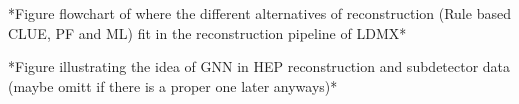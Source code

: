 *Figure flowchart of where the different alternatives of reconstruction (Rule based CLUE, PF and ML) fit in the reconstruction pipeline of LDMX*

*Figure illustrating the idea of GNN in HEP reconstruction and subdetector data (maybe omitt if there is a proper one later anyways)*
















































































































